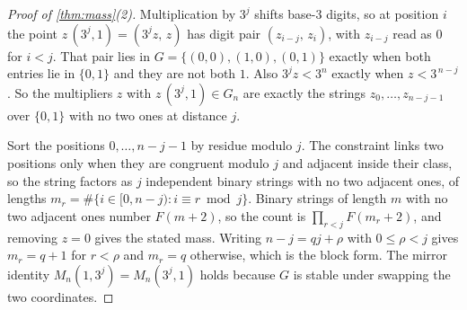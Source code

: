 \documentclass[11pt]{amsart}
\theoremstyle{definition}
\theoremstyle{remark}
\begin{document}
\begin{proof}[Proof of \cref{thm:mass}(2)]
Multiplication by $3^j$ shifts base-$3$ digits, so at position $i$ the point $z\,(3^j,1)=(3^jz,\,z)$ has digit pair $(z_{i-j},\,z_i)$, with $z_{i-j}$ read as $0$ for $i<j$. That pair lies in $G=\{(0,0),(1,0),(0,1)\}$ exactly when both entries lie in $\{0,1\}$ and they are not both $1$. Also $3^jz<3^n$ exactly when $z<3^{\,n-j}$. So the multipliers $z$ with $z\,(3^j,1)\in G_n$ are exactly the strings $z_0,\dots,z_{n-j-1}$ over $\{0,1\}$ with no two ones at distance $j$.

Sort the positions $0,\dots,n-j-1$ by residue modulo $j$. The constraint links two positions only when they are congruent modulo $j$ and adjacent inside their class, so the string factors as $j$ independent binary strings with no two adjacent ones, of lengths $m_r=\#\{i\in[0,n-j): i\equiv r\bmod j\}$. Binary strings of length $m$ with no two adjacent ones number $F(m+2)$, so the count is $\prod_{r<j}F(m_r+2)$, and removing $z=0$ gives the stated mass. Writing $n-j=qj+\rho$ with $0\le\rho<j$ gives $m_r=q+1$ for $r<\rho$ and $m_r=q$ otherwise, which is the block form. The mirror identity $M_n(1,3^j)=M_n(3^j,1)$ holds because $G$ is stable under swapping the two coordinates.
\end{proof}
\end{document}
